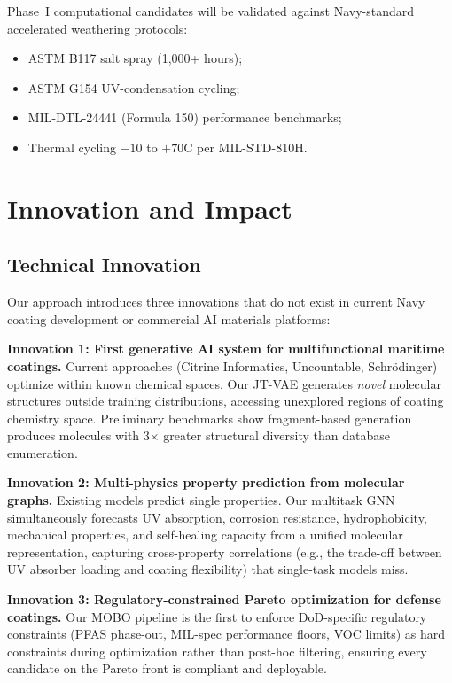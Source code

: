 \documentclass[11pt,letterpaper]{article}
\begin{document}
Phase~I computational candidates will be validated against Navy-standard
accelerated weathering protocols:
\begin{itemize}[nosep]
  \item ASTM B117 salt spray (1,000+ hours);
  \item ASTM G154 UV-condensation cycling;
  \item MIL-DTL-24441 (Formula 150) performance benchmarks;
  \item Thermal cycling $-10$ to $+70$\textdegree C per MIL-STD-810H.
\end{itemize}

\section{Innovation and Impact}
\label{sec:innovation}

\subsection{Technical Innovation}

Our approach introduces three innovations that do not exist in current Navy
coating development or commercial AI materials platforms:

\textbf{Innovation 1: First generative AI system for multifunctional maritime
coatings.} Current approaches (Citrine Informatics, Uncountable, Schr\"odinger)
optimize within known chemical spaces. Our JT-VAE generates \emph{novel}
molecular structures outside training distributions, accessing unexplored
regions of coating chemistry space. Preliminary benchmarks show fragment-based
generation produces molecules with 3$\times$ greater structural diversity than
database enumeration.

\textbf{Innovation 2: Multi-physics property prediction from molecular graphs.}
Existing models predict single properties. Our multitask GNN simultaneously
forecasts UV absorption, corrosion resistance, hydrophobicity, mechanical
properties, and self-healing capacity from a unified molecular representation,
capturing cross-property correlations (e.g., the trade-off between UV absorber
loading and coating flexibility) that single-task models miss.

\textbf{Innovation 3: Regulatory-constrained Pareto optimization for defense
coatings.} Our MOBO pipeline is the first to enforce DoD-specific regulatory
constraints (PFAS phase-out, MIL-spec performance floors, VOC limits) as hard
constraints during optimization rather than post-hoc filtering, ensuring every
candidate on the Pareto front is compliant and deployable.
\end{document}
